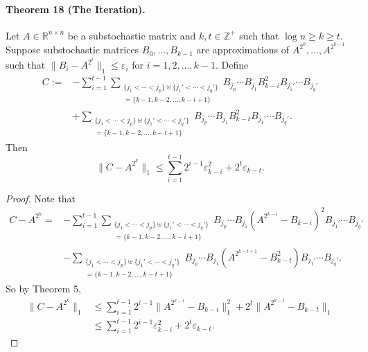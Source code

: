 \documentclass[10pt,a4paper]{article}
\begin{document}
\paragraph{Theorem 18 (The Iteration).} Let $A\in\mathbb R^{n\times n}$ be a substochastic matrix and $k,t\in\mathbb Z^+$ such that $\log n\ge k\ge t$. Suppose substochastic matrices $B_0,\ldots,B_{k-1}$ are approximations of $A^{2^0},\ldots,A^{2^{k-1}}$ such that $\|B_i-A^{2^i}\|_1\le\varepsilon_i$ for $i=1,2,\ldots,k-1$. Define
\begin{align*}
C:=&-\sum_{i=1}^{t-1}\sum_{\substack{\{j_1<\cdots<j_p\}\uplus\{j_1'<\cdots<j_q'\}\\=\{k-1,k-2,\ldots,k-i+1\}}}B_{j_p}\cdots B_{j_1}B_{k-i}^2 B_{j_1'}\cdots B_{j_q'}\\
&+\sum_{\substack{\{j_1<\cdots<j_p\}\uplus\{j_1'<\cdots<j_q'\}\\=\{k-1,k-2,\ldots,k-t+1\}}}B_{j_p}\cdots B_{j_1}B_{k-t}^2 B_{j_1'}\cdots B_{j_q'}.
\end{align*}
Then
\[\|C-A^{2^k}\|_1\le\sum_{i=1}^{t-1}2^{i-1}\varepsilon_{k-i}^2+2^t\varepsilon_{k-t}.\]
\begin{proof}
Note that
\begin{align*}
C-A^{2^k}=&-\sum_{i=1}^{t-1}\sum_{\substack{\{j_1<\cdots<j_p\}\uplus\{j_1'<\cdots<j_q'\}\\=\{k-1,k-2,\ldots,k-i+1\}}}B_{j_p}\cdots B_{j_1}(A^{2^{k-i}}-B_{k-i})^2B_{j_1'}\cdots B_{j_q'}\\
&-\sum_{\substack{\{j_1<\cdots<j_p\}\uplus\{j_1'<\cdots<j_q'\}\\=\{k-1,k-2,\ldots,k-t+1\}}}B_{j_p}\cdots B_{j_1}(A^{2^{k-t+1}}-B_{k-t}^2)B_{j_1'}\cdots B_{j_q'}.
\end{align*}
So by Theorem 5,
\begin{align*}\|C-A^{2^k}\|_1&\le\sum_{i=1}^{t-1}2^{i-1}\|A^{2^{k-i}}-B_{k-i}\|_1^2+2^t\|A^{2^{k-t}}-B_{k-t}\|_1\\&\le\sum_{i=1}^{t-1}2^{i-1}\varepsilon_{k-i}^2+2^t\varepsilon_{k-t}.\end{align*}
\end{proof}
\end{document}
